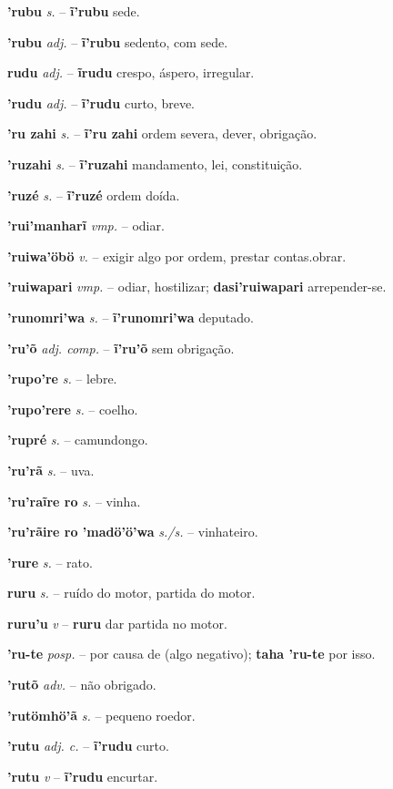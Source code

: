 \textbf{'rubu} \textit{s.} -- \textbf{ĩ'rubu} sede.

\textbf{'rubu} \textit{adj.} -- \textbf{ĩ'rubu} sedento, com sede.

\textbf{rudu} \textit{adj.} -- \textbf{ĩrudu} crespo, áspero, irregular.

\textbf{'rudu} \textit{adj.} -- \textbf{ĩ'rudu} curto, breve.

\textbf{'ru zahi} \textit{s.} -- \textbf{ĩ'ru zahi} ordem severa, dever, obrigação.

\textbf{'ruzahi} \textit{s.} -- \textbf{ĩ'ruzahi} mandamento, lei, constituição.

\textbf{'ruzé} \textit{s.} -- \textbf{ĩ'ruzé} ordem doída.

\textbf{'rui'manharĩ} \textit{vmp.} -- odiar.

\textbf{'ruiwa'öbö} \textit{v.} -- exigir algo por ordem, prestar contas.obrar.

\textbf{'ruiwapari} \textit{vmp.} -- odiar, hostilizar; \textbf{dasi'ruiwapari} arrepender-se.

\textbf{'runomri'wa} \textit{s.} -- \textbf{ĩ'runomri'wa} deputado.

\textbf{'ru'õ} \textit{adj. comp.} -- \textbf{ĩ'ru'õ} sem obrigação.

\textbf{'rupo're} \textit{s.} -- lebre.

\textbf{'rupo'rere} \textit{s.} -- coelho.

\textbf{'rupré} \textit{s.} -- camundongo.

\textbf{'ru'rã} \textit{s.} -- uva.

\textbf{'ru'raĩre ro} \textit{s.} -- vinha.

\textbf{'ru'rãire ro 'madö'ö'wa} \textit{s./s.} -- vinhateiro.

\textbf{'rure} \textit{s.} -- rato.

\textbf{ruru} \textit{s.} -- ruído do motor, partida do motor.

\textbf{ruru'u} \textit{v} -- \textbf{ruru} dar partida no motor.

\textbf{'ru-te} \textit{posp.} -- por causa de (algo negativo); \textbf{taha 'ru-te} por isso.

\textbf{'rutõ} \textit{adv.} -- não obrigado.

\textbf{'rutömhö'ã} \textit{s.} -- pequeno roedor.

\textbf{'rutu} \textit{adj. c.} -- \textbf{ĩ'rudu} curto.

\textbf{'rutu} \textit{v} -- \textbf{ĩ'rudu} encurtar.


